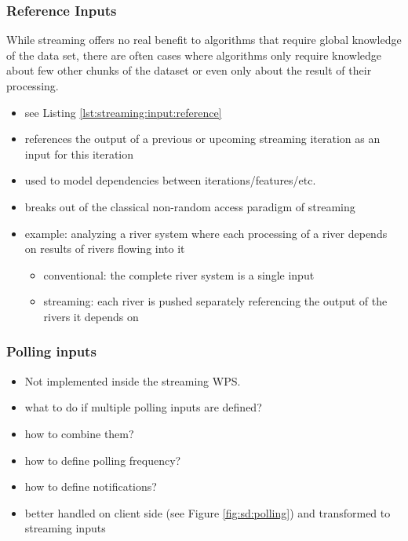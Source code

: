 		\subsubsection{Reference Inputs}
			\label{sec:stream:input:reference}
			While streaming offers no real benefit to algorithms that require global knowledge of the data set, there are often cases where algorithms only require knowledge about few other chunks of the dataset or even only about the result of their processing.
			\begin{itemize}
				\item see Listing \ref{lst:streaming:input:reference}
				\item references the output of a previous or upcoming streaming iteration as an input for this iteration
				\item used to model dependencies between iterations/features/etc.
				\item breaks out of the classical non-random access paradigm of streaming
				\item example: analyzing a river system where each processing of a river depends on results of rivers flowing into it
				\begin{itemize}
					\item conventional: the complete river system is a single input
					\item streaming: each river is pushed separately referencing the output of the rivers it depends on
				\end{itemize}
			\end{itemize}

		\subsubsection{Polling inputs}
			\label{sec:stream:input:polling}
			\begin{itemize}
				\item Not implemented inside the streaming WPS.
				\item what to do if multiple polling inputs are defined?
				\item how to combine them?
				\item how to define polling frequency?
				\item how to define notifications?
				\item better handled on client side (see Figure \ref{fig:sd:polling}) and transformed to streaming inputs
			\end{itemize}

